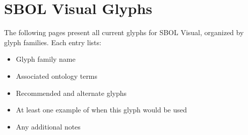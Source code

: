 \section{SBOL Visual Glyphs}\label{apdx:symbols}

The following pages present all current glyphs for SBOL Visual, organized by glyph families.
Each entry lists:
\begin{itemize}
\item Glyph family name
\item Associated ontology terms
\item Recommended and alternate glyphs
\item At least one example of when this glyph would be used
\item Any additional notes
\end{itemize}


